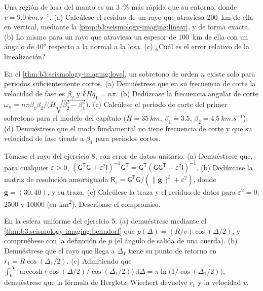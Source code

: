\begin{exercise}[$\star\star$]\label{exo:b3:seismology-imaging:9}
Una región de losa del manto es un \qty{3}{\percent} más rápida que su entorno,
donde $v = \qty{9.0}{km.s^{-1}}$. (a) Calcúlese el residuo de un rayo que atraviesa
\qty{200}{km} de ella en vertical, mediante la \cref{prop:b3:seismology-imaging:linear},
y de forma exacta. (b) Lo mismo para un rayo que atraviesa un espesor de \qty{100}{km} de ella con un ángulo de
\ang{40} respecto a la normal a la losa. (c) ¿Cuál es el error relativo de la
linealización?
\end{exercise}

\begin{exercise}[$\star\star\star$]\label{exo:b3:seismology-imaging:10}
En el \cref{thm:b3:seismology-imaging:love}, un sobretono de orden $n$ existe solo
para periodos suficientemente cortos. (a) Demuéstrese que en su frecuencia de corte la velocidad de fase es
$\beta_2$ y $kHq_1 = n\pi$. (b) Dedúzcase la frecuencia angular de corte
$\omega_n = n\pi\beta_1\beta_2/\bigl(H\sqrt{\beta_2^2 - \beta_1^2}\bigr)$.
(c) Calcúlese el periodo de corte del primer sobretono para el modelo del capítulo
($H = \qty{35}{km}$, $\beta_1 = 3.5$, $\beta_2 = \qty{4.5}{km.s^{-1}}$).
(d) Demuéstrese que el modo fundamental no tiene frecuencia de corte y que su velocidad de fase
tiende a $\beta_1$ para periodos cortos.
\end{exercise}

\begin{exercise}[$\star\star\star$]\label{exo:b3:seismology-imaging:11}
Tómese el rayo del ejercicio 8, con error de datos unitario. (a) Demuéstrese que, para cualquier
$\varepsilon > 0$, $(\mathsf G^{\mathsf T}\mathsf G + \varepsilon^2\mathsf
I)^{-1}\mathsf G^{\mathsf T} = \mathsf G^{\mathsf T}(\mathsf G\mathsf
G^{\mathsf T} + \varepsilon^2\mathsf I)^{-1}$. (b) Dedúzcase la
matriz de resolución amortiguada $\mathsf R_\varepsilon = \mathsf G^{\mathsf T}\mathsf G/(\|\mathbf g\|^2 +
\varepsilon^2)$, donde $\mathbf g = (30, 40)$, y su traza. (c) Calcúlese la
traza y el residuo de datos para $\varepsilon^2 = 0$, 2500 y \num{10000}
(en \unit{km^2}). Descríbase el compromiso.
\end{exercise}

\begin{exercise}[$\star\star\star$]\label{exo:b3:seismology-imaging:12}
En la esfera uniforme del ejercicio 5: (a) demuéstrese mediante
el \cref{thm:b3:seismology-imaging:benndorf} que $p(\Delta) = (R/v)\cos(\Delta/2)$,
y compruébese con la definición de $p$ (el ángulo de salida de una cuerda).
(b) Demuéstrese que el rayo que llega a $\Delta_1$ tiene su punto de retorno en $r_1 = R\cos(\Delta_1/2)$.
(c) Admitiendo que $\int_0^{\Delta_1}\operatorname{arccosh}\bigl(\cos(\Delta/2)
/\cos(\Delta_1/2)\bigr)\,\mathrm d\Delta = \pi\ln\bigl(1/\cos(\Delta_1/2)\bigr)$,
demuéstrese que la fórmula de Herglotz--Wiechert devuelve $r_1$ y la velocidad $v$.
\end{exercise}

